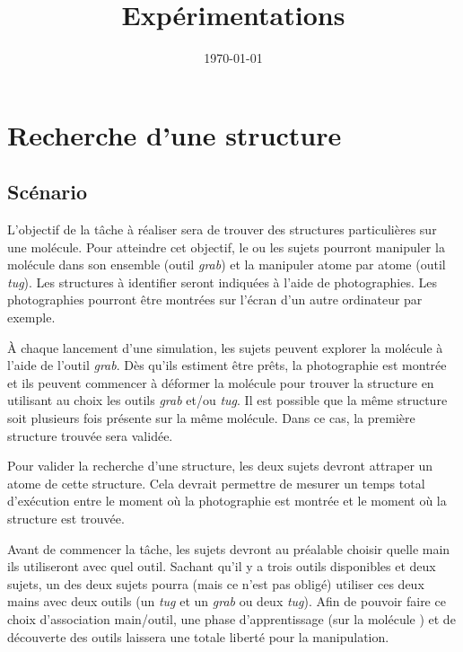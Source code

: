 \documentclass[a4paper,fleqn]{report}
\title{Expérimentations}
\author{}
\date{\today}
\begin{document}
	\maketitle
	\chapter{Recherche d'une structure}
		\section{Scénario}
			L'objectif de la tâche à réaliser sera de trouver des structures particulières sur une molécule.
			Pour atteindre cet objectif, le ou les sujets pourront manipuler la molécule dans son ensemble (outil \emph{grab}) et la manipuler atome par atome (outil \emph{tug}).
			Les structures à identifier seront indiquées à l'aide de photographies.
			Les photographies pourront être montrées sur l'écran d'un autre ordinateur par exemple.

			À chaque lancement d'une simulation, les sujets peuvent explorer la molécule à l'aide de l'outil \emph{grab}.
			Dès qu'ils estiment être prêts, la photographie est montrée et ils peuvent commencer à déformer la molécule pour trouver la structure en utilisant au choix les outils \emph{grab} et/ou \emph{tug}.
			Il est possible que la même structure soit plusieurs fois présente sur la même molécule.
			Dans ce cas, la première structure trouvée sera validée.

			Pour valider la recherche d'une structure, les deux sujets devront attraper un atome de cette structure.
			Cela devrait permettre de mesurer un temps total d'exécution entre le moment où la photographie est montrée et le moment où la structure est trouvée.

			Avant de commencer la tâche, les sujets devront au préalable choisir quelle main ils utiliseront avec quel outil.
			Sachant qu'il y a trois outils disponibles et deux sujets, un des deux sujets pourra (mais ce n'est pas obligé) utiliser ces deux mains avec deux outils (un \emph{tug} et un \emph{grab} ou deux \emph{tug}).
			Afin de pouvoir faire ce choix d'association main/outil, une phase d'apprentissage (sur la molécule ) et de découverte des outils laissera une totale liberté pour la manipulation.
\end{document}
